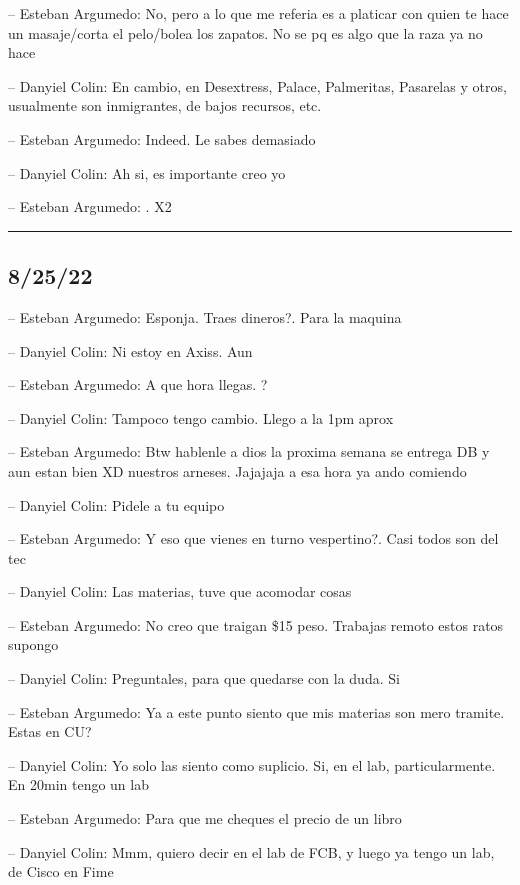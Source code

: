 -- Esteban Argumedo: No, pero a lo que me referia es a platicar con
quien te hace un masaje/corta el pelo/bolea los zapatos. No se pq es
algo que la raza ya no hace

-- Danyiel Colin: En cambio, en Desextress, Palace, Palmeritas,
Pasarelas y otros, usualmente son inmigrantes, de bajos recursos, etc.

-- Esteban Argumedo: Indeed. Le sabes demasiado

-- Danyiel Colin: Ah si, es importante creo yo

-- Esteban Argumedo: . X2

\begin{center}\rule{0.5\linewidth}{0.5pt}\end{center}

\hypertarget{section-150}{%
\subsection{8/25/22}\label{section-150}}

-- Esteban Argumedo: Esponja. Traes dineros?. Para la maquina

-- Danyiel Colin: Ni estoy en Axiss. Aun

-- Esteban Argumedo: A que hora llegas. ?

-- Danyiel Colin: Tampoco tengo cambio. Llego a la 1pm aprox

-- Esteban Argumedo: Btw hablenle a dios la proxima semana se entrega DB
y aun estan bien XD nuestros arneses. Jajajaja a esa hora ya ando
comiendo

-- Danyiel Colin: Pidele a tu equipo

-- Esteban Argumedo: Y eso que vienes en turno vespertino?. Casi todos
son del tec

-- Danyiel Colin: Las materias, tuve que acomodar cosas

-- Esteban Argumedo: No creo que traigan \$15 peso. Trabajas remoto
estos ratos supongo

-- Danyiel Colin: Preguntales, para que quedarse con la duda. Si

-- Esteban Argumedo: Ya a este punto siento que mis materias son mero
tramite. Estas en CU?

-- Danyiel Colin: Yo solo las siento como suplicio. Si, en el lab,
particularmente. En 20min tengo un lab

-- Esteban Argumedo: Para que me cheques el precio de un libro

-- Danyiel Colin: Mmm, quiero decir en el lab de FCB, y luego ya tengo
un lab, de Cisco en Fime

